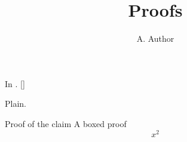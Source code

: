 \documentclass{elsart}
\makeatletter
\newcommand\showjournal{In \@journal. [\@blstr]}
\makeatother
\begin{document}
\begin{frontmatter}
\title{Proofs}
\author{A. Author}
\address{Univ, , }
\end{frontmatter}
\makeatletter\output@glob@notes\makeatother
\showjournal
\begin{pf}
Plain.
\end{pf}
\begin{pf*}{Proof of the claim}
A boxed proof
$$x^2$$
\end{pf*}
\end{document}
